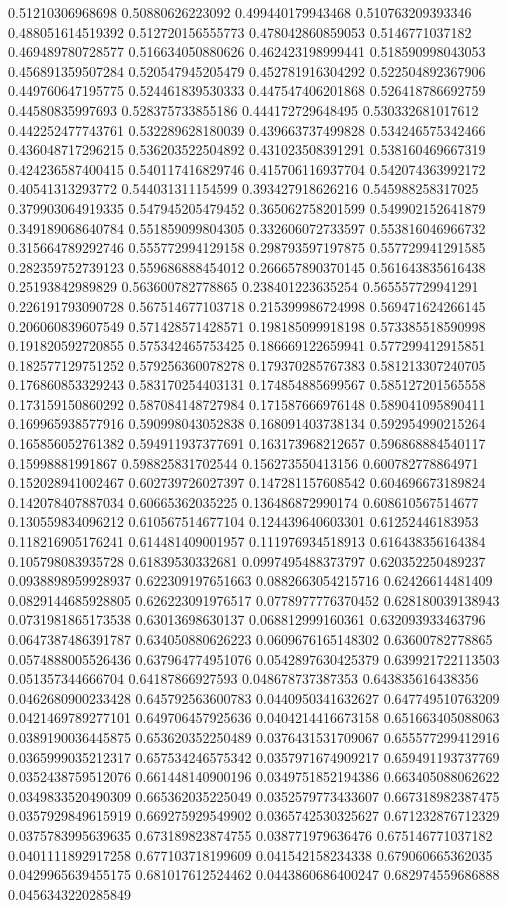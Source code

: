 \begin{table}
\begin{tabu}
\begin{sparkline}{10}
0.51210306968698 0.50880626223092 0.499440179943468 0.510763209393346 0.488051614519392 0.512720156555773 0.478042860859053 0.5146771037182 0.469489780728577 0.516634050880626 0.462423198999441 0.518590998043053 0.456891359507284 0.520547945205479 0.452781916304292 0.522504892367906 0.449760647195775 0.524461839530333 0.447547406201868 0.526418786692759 0.44580835997693 0.528375733855186 0.444172729648495 0.530332681017612 0.442252477743761 0.532289628180039 0.439663737499828 0.534246575342466 0.436048717296215 0.536203522504892 0.431023508391291 0.538160469667319 0.424236587400415 0.540117416829746 0.415706116937704 0.542074363992172 0.40541313293772 0.544031311154599 0.393427918626216 0.545988258317025 0.379903064919335 0.547945205479452 0.365062758201599 0.549902152641879 0.349189068640784 0.551859099804305 0.332606072733597 0.553816046966732 0.315664789292746 0.555772994129158 0.298793597197875 0.557729941291585 0.282359752739123 0.559686888454012 0.266657890370145 0.561643835616438 0.25193842989829 0.563600782778865 0.238401223635254 0.565557729941291 0.226191793090728 0.567514677103718 0.215399986724998 0.569471624266145 0.206060839607549 0.571428571428571 0.198185099918198 0.573385518590998 0.191820592720855 0.575342465753425 0.186669122659941 0.577299412915851 0.182577129751252 0.579256360078278 0.179370285767383 0.581213307240705 0.176860853329243 0.583170254403131 0.174854885699567 0.585127201565558 0.173159150860292 0.587084148727984 0.171587666976148 0.589041095890411 0.169965938577916 0.590998043052838 0.168091403738134 0.592954990215264 0.165856052761382 0.594911937377691 0.163173968212657 0.596868884540117 0.15998881991867 0.598825831702544 0.156273550413156 0.600782778864971 0.152028941002467 0.602739726027397 0.147281157608542 0.604696673189824 0.142078407887034 0.60665362035225 0.136486872990174 0.608610567514677 0.130559834096212 0.610567514677104 0.124439640603301 0.61252446183953 0.118216905176241 0.614481409001957 0.111976934518913 0.616438356164384 0.105798083935728 0.61839530332681 0.0997495488373797 0.620352250489237 0.0938898959928937 0.622309197651663 0.0882663054215716 0.62426614481409 0.0829144685928805 0.626223091976517 0.0778977776370452 0.628180039138943 0.0731981865173538 0.63013698630137 0.068812999160361 0.632093933463796 0.0647387486391787 0.634050880626223 0.0609676165148302 0.63600782778865 0.0574888005526436 0.637964774951076 0.0542897630425379 0.639921722113503 0.051357344666704 0.64187866927593 0.048678737387353 0.643835616438356 0.0462680900233428 0.645792563600783 0.0440950341632627 0.647749510763209 0.0421469789277101 0.649706457925636 0.0404214416673158 0.651663405088063 0.0389190036445875 0.653620352250489 0.0376431531709067 0.655577299412916 0.0365999035212317 0.657534246575342 0.0357971674909217 0.659491193737769 0.0352438759512076 0.661448140900196 0.0349751852194386 0.663405088062622 0.0349833520490309 0.665362035225049 0.0352579773433607 0.667318982387475 0.0357929849615919 0.669275929549902 0.0365742530325627 0.671232876712329 0.0375783995639635 0.673189823874755 0.038771979636476 0.675146771037182 0.0401111892917258 0.677103718199609 0.041542158234338 0.679060665362035 0.0429965639455175 0.681017612524462 0.0443860686400247 0.682974559686888 0.0456343220285849 
\end{sparkline}
\end{tabu}
\end{table}
